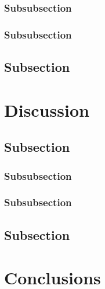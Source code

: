 \documentclass[fleqn,10pt,lineno]{wlpeerj}
\begin{document}
\lipsum[11] %

\subsubsection*{Subsubsection}

\lipsum[12] %

\subsubsection*{Subsubsection}

\lipsum[14] %

\subsection*{Subsection}

\lipsum[15-20] %


\section*{Discussion}

\lipsum[10] %

\subsection*{Subsection}

\lipsum[11] %

\subsubsection*{Subsubsection}

\lipsum[12] %

\subsubsection*{Subsubsection}

\lipsum[14] %

\subsection*{Subsection}

\lipsum[15-20] %


\section*{Conclusions}
\end{document}
